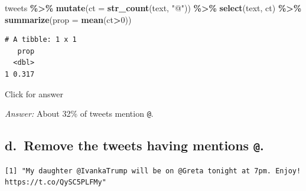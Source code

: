 \documentclass[
]{book}
\newenvironment{Shaded}{\begin{snugshade}}{\end{snugshade}}
\newcommand{\AttributeTok}[1]{\textcolor[rgb]{0.13,0.29,0.53}{#1}}
\newcommand{\DecValTok}[1]{\textcolor[rgb]{0.00,0.00,0.81}{#1}}
\newcommand{\FunctionTok}[1]{\textcolor[rgb]{0.13,0.29,0.53}{\textbf{#1}}}
\newcommand{\NormalTok}[1]{#1}
\newcommand{\OtherTok}[1]{\textcolor[rgb]{0.56,0.35,0.01}{#1}}
\newcommand{\SpecialCharTok}[1]{\textcolor[rgb]{0.81,0.36,0.00}{\textbf{#1}}}
\newcommand{\StringTok}[1]{\textcolor[rgb]{0.31,0.60,0.02}{#1}}
\begin{document}
\begin{Shaded}
\begin{Highlighting}[]
\NormalTok{tweets }\SpecialCharTok{\%\textgreater{}\%} \FunctionTok{mutate}\NormalTok{(}\AttributeTok{ct =} \FunctionTok{str\_count}\NormalTok{(text, }\StringTok{"@"}\NormalTok{)) }\SpecialCharTok{\%\textgreater{}\%}
  \FunctionTok{select}\NormalTok{(text, ct) }\SpecialCharTok{\%\textgreater{}\%}
  \FunctionTok{summarize}\NormalTok{(}\AttributeTok{prop =} \FunctionTok{mean}\NormalTok{(ct}\SpecialCharTok{\textgreater{}}\DecValTok{0}\NormalTok{))}
\end{Highlighting}
\end{Shaded}

\begin{verbatim}
# A tibble: 1 x 1
   prop
  <dbl>
1 0.317
\end{verbatim}

Click for answer

\emph{Answer:} About 32\% of tweets mention \texttt{@}.

\hypertarget{d.-remove-the-tweets-having-mentions-.}{%
\subsection{\texorpdfstring{d.~Remove the tweets having mentions \texttt{@}.}{d.~Remove the tweets having mentions @.}}\label{d.-remove-the-tweets-having-mentions-.}}

\begin{Shaded}
\end{Shaded}

\begin{verbatim}
[1] "My daughter @IvankaTrump will be on @Greta tonight at 7pm. Enjoy! https://t.co/QySC5PLFMy"
\end{verbatim}

\begin{Shaded}
\end{Shaded}
\end{document}
